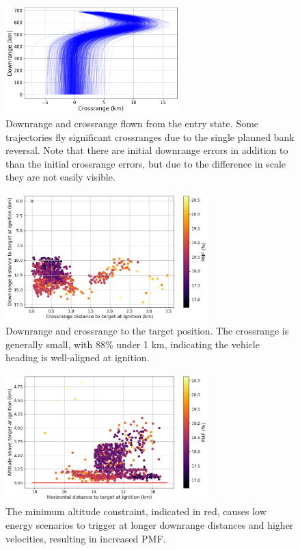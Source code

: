 \documentclass[letterpaper, paper,11pt]{AAS}
\begin{document}
\begin{figure}[h!]
	\centering
	\includegraphics[width=0.6\textwidth]{dr_cr} 
	\caption{Downrange and crossrange flown from the entry state. Some trajectories fly significant crossranges due to the single planned bank reversal. Note that there are initial downrange errors in addition to than the initial crossrange errors, but due to the difference in scale they are not easily visible.}
	\label{fig_mc_entry_dr_cr}
\end{figure}
\begin{figure}[h!]
	\centering
	\includegraphics[width=0.7\textwidth]{ignition_dr_cr} 
	\caption{Downrange and crossrange to the target position. The crossrange is generally small, with 88\% under 1 km, indicating the vehicle heading is well-aligned at ignition.}
	\label{fig_mc_ignition_dr_cr}
\end{figure}
\begin{figure}[h!]
	\centering
	\includegraphics[width=0.7\textwidth]{ignition_alt_range} 
	\caption{The minimum altitude constraint, indicated in red, causes low energy scenarios to trigger at longer downrange distances and higher velocities, resulting in increased PMF.}
	\label{fig_mc_ignition_alt_vs_distance}
\end{figure}
\end{document}
